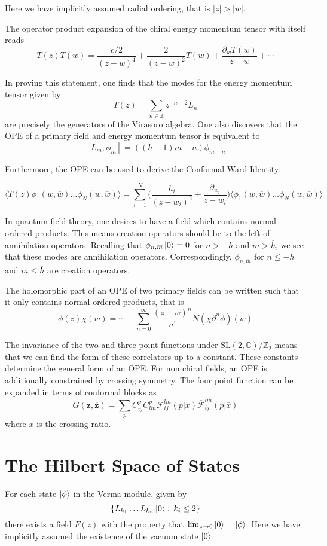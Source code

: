 \documentclass{article}
\newcommand{\Z}{\mathbb{Z}}
\newcommand{\C}{\mathbb{C}}
\begin{document}
Here we have implicitly assumed radial ordering, that is $|z| > |w|$. 

The operator product expansion of the chiral energy momentum tensor with itself reads
$$T(z)T(w)=\frac{c/2}{(z-w)^4}+\frac{2}{(z-w)^2}T(w)+\frac{\partial_wT(w)}{z-w}+\cdots$$

In proving this statement, one finds that the modes for the energy momentum tensor given by $$T(z)=\sum_{n \in \Z}z^{-n-2}L_n$$ are precisely the generators of the Virasoro algebra. One also discovers that the OPE of a primary field and energy momentum tensor is equivalent to $$[L_m,\phi_m]=((h-1)m-n)\phi_{m+n}$$

Furthermore, the OPE can be used to derive the Conformal Ward Identity:

$$\langle T(z)\phi_1(w,\overline{w})\dots\phi_N(w,\overline{w})\rangle=\sum_{i=1}^N\Big(\frac{h_i}{(z-w_i)^2}+\frac{\partial_{w_i}}{z-w_i} \Big)\langle \phi_1(w,\overline{w})\dots\phi_N(w,\overline{w})\rangle$$

In quantum field theory, one desires to have a field which contains normal ordered products. This means creation operators should be to the left of annihilation operators. Recalling that $\phi_{n,\overline{m}}\ket{0}=0$ for $n>-h$ and $\overline{m}>\overline{h}$, we see that these modes are annihilation operators. Correspondingly, $\phi_{n,\overline{m}}$ for $n\leq-h$ and $\overline{m}\leq\overline{h}$ are creation operators. 

The holomorphic part of an OPE of two primary fields can be written such that it only contains normal ordered products, that is $$\phi(z)\chi(w)=\cdots+\sum_{n=0}^{\infty}\frac{(z-w)^n}{n!}N(\chi\partial^n\phi)(w)$$

The invariance of the two and three point functions under $\text{SL}(2,\C)/\Z_2$ means that we can find the form of these correlators up to a constant. These constants determine the general form of an OPE. For non chiral fields, an OPE is additionally constrained by crossing symmetry. The four point function can be expanded in terms of conformal blocks as $$G(\textbf{z},\overline{\textbf{z}})=\sum_pC^p_{ij}C^p_{lm}\mathcal{F}_{ij}^{lm}(p|x)\overline{\mathcal{F}}^{lm}_{ij}(p|\overline{x})$$ where $x$ is the crossing ratio. 

\section{The Hilbert Space of States}

For each state $\ket{\phi}$ in the Verma module, given by $$\{L_{k_1}\dots L_{k_n}\ket{0}:\, k_i \leq 2\}$$ there exists a field $F(z)$ with the property that $\lim_{z \rightarrow 0}\ket{0}=\ket{\phi}$. Here we have implicitly assumed the existence of the vacuum state $\ket{0}$.  
\end{document}
